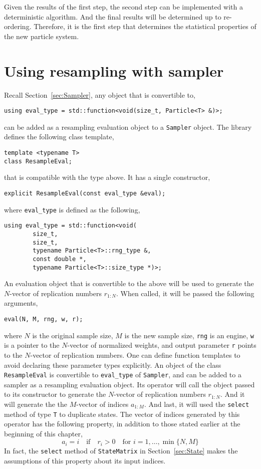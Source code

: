 Given the results of the first step, the second step can be implemented with a
deterministic algorithm. And the final results will be determined up to
re-ordering. Therefore, it is the first step that determines the statistical
properties of the new particle system.

\section{Using resampling with sampler}
\label{sec:Using resampling with sampler}

Recall Section~\ref{sec:Sampler}, any object that is convertible to,
\begin{Verbatim}
using eval_type = std::function<void(size_t, Particle<T> &)>;
\end{Verbatim}
can be added as a resampling evaluation object to a \verb|Sampler| object. The
library defines the following class template,
\begin{Verbatim}
template <typename T>
class ResampleEval;
\end{Verbatim}
that is compatible with the type above. It has a single constructor,
\begin{Verbatim}
explicit ResampleEval(const eval_type &eval);
\end{Verbatim}
where \verb|eval_type| is defined as the following,
\begin{Verbatim}
using eval_type = std::function<void(
        size_t,
        size_t,
        typename Particle<T>::rng_type &,
        const double *,
        typename Particle<T>::size_type *)>;
\end{Verbatim}
An evaluation object that is convertible to the above will be used to generate
the $N$-vector of replication numbers $r_{1:N}$. When called, it will be passed
the following arguments,
\begin{Verbatim}
eval(N, M, rng, w, r);
\end{Verbatim}
where $N$ is the original sample size, $M$ is the new sample size, \verb|rng|
is an \rng engine, \verb|w| is a pointer to the $N$-vector of normalized
weights, and output parameter \verb|r| points to the $N$-vector of replication
numbers. One can define function templates to avoid declaring these parameter
types explicitly. An object of the class \verb|ResampleEval| is convertible to
\verb|eval_type| of \verb|Sampler|, and can be added to a sampler as a
resampling evaluation object. Its operator will call the object passed to its
constructor to generate the $N$-vector of replication numbers $r_{1:N}$. And it
will generate the the $M$-vector of indices $a_{1:M}$. And last, it will used
the \verb|select| method of type \verb|T| to duplicate states. The vector of
indices generated by this operator has the following property, in addition to
those stated earlier at the beginning of this chapter,
\begin{equation*}
  a_i = i \quad \text{if} \quad  r_i > 0 \quad
  \text{for } i = 1,\dots,\min\{N, M\}
\end{equation*}
In fact, the \verb|select| method of \verb|StateMatrix| in
Section~\ref{sec:State} makes the assumptions of this property about its input
indices.

